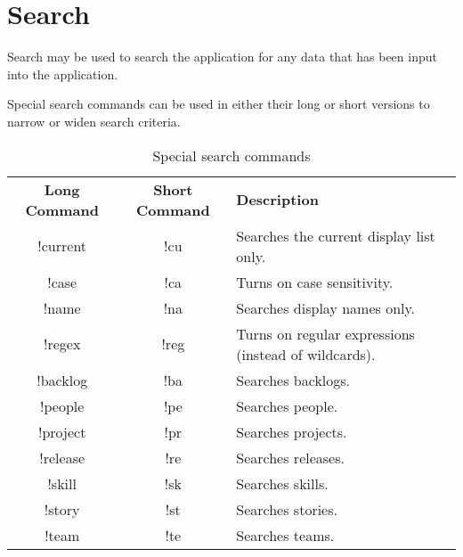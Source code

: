 \section{Search}

Search may be used to search the application for any data that has been input into the application.



Special search commands can be used in either their long or short versions to narrow or widen search criteria.

\begin{table}[]
\centering
\caption{Special search commands}
\label{my-label}
\begin{tabular}{|c|c|l|}
{\bf Long Command} & {\bf Short Command} & {\bf Description}                                    \\
!current           & !cu                 & Searches the current display list only.              \\
!case              & !ca                 & Turns on case sensitivity.                           \\
!name              & !na                 & Searches display names only.                         \\
!regex             & !reg                & Turns on regular expressions (instead of wildcards). \\
!backlog           & !ba                 & Searches backlogs.                                   \\
!people            & !pe                 & Searches people.                                     \\
!project           & !pr                 & Searches projects.                                   \\
!release           & !re                 & Searches releases.                                   \\
!skill             & !sk                 & Searches skills.                                     \\
!story             & !st                 & Searches stories.                                    \\
!team              & !te                 & Searches teams.
\end{tabular}
\end{table}